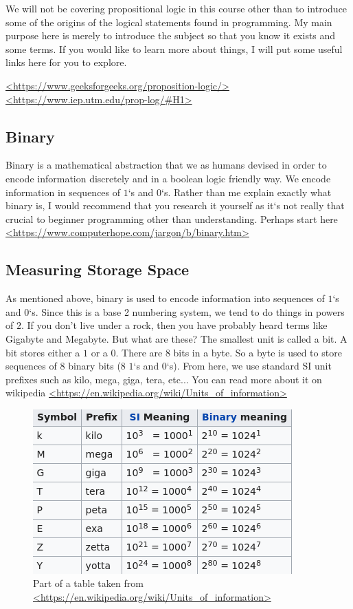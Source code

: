 \documentclass[11]{article}
\begin{document}
We will not be covering propositional logic in this course other than to introduce some of the origins of the logical statements found in programming. My main purpose here is merely to introduce the subject so that you know it exists and some terms. If you would like to learn more about things, I will put some useful links here for you to explore.

\url{<https://www.geeksforgeeks.org/proposition-logic/>}\\
\url {<https://www.iep.utm.edu/prop-log/#H1>}

\subsection{Binary}
Binary is a mathematical abstraction that we as humans devised in order to encode information discretely and in a boolean logic friendly way. We encode information in sequences of $1$`s and $0$`s. Rather than me explain exactly what binary is, I would recommend that you research it yourself as it`s not really that crucial to beginner programming other than understanding. Perhaps start here \url{<https://www.computerhope.com/jargon/b/binary.htm>}

\subsection{Measuring Storage Space}
As mentioned above, binary is used to encode information into sequences of $1$`s and $0$`s. Since this is a base 2 numbering system, we tend to do things in powers of $2$. If you don't live under a rock, then you have probably heard terms like Gigabyte and Megabyte. But what are these? The smallest unit is called a bit. A bit stores either a $1$ or a $0$. There are 8 bits in a byte. So a byte is used to store sequences of 8 binary bits (8 $1$`s and $0$`s). From here, we use standard SI unit prefixes such as kilo, mega, giga, tera, etc... You can read more about it on wikipedia \url{<https://en.wikipedia.org/wiki/Units_of_information>}\\

\begin{figure}[H]
	\centering
	\includegraphics[scale=0.75]{sizes.png}
	\caption{Part of a table taken from \url{<https://en.wikipedia.org/wiki/Units_of_information>}}
\end{figure}
\end{document}
